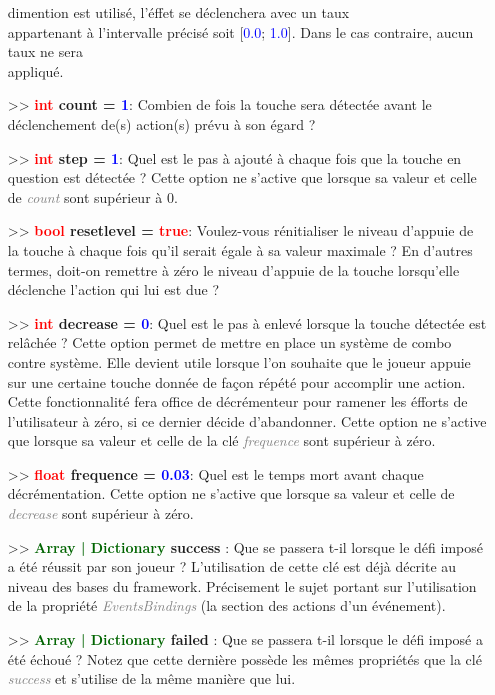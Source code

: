 \documentclass[a4paper, 11pt]{article}
\begin{document}
\begin{itemize}
		dimention est utilisé, l'éffet se déclenchera avec un taux \\appartenant à l'intervalle précisé soit 
		[\textcolor{blue}{0.0}; \textcolor{blue}{1.0}]. Dans le cas contraire, aucun taux ne sera
		\\appliqué.\\
		\item[>> \textbf{\textcolor{red}{int} count = \textcolor{blue}{1}}:] Combien de fois la touche sera 
		détectée avant le déclenchement de(s) action(s) prévu à son égard ?\\
		\item[>> \textbf{\textcolor{red}{int} step = \textcolor{blue}{1}}:] Quel est le pas à ajouté à 
		chaque fois que la touche en question est détectée ? Cette option ne s'active que lorsque sa valeur 
		et celle de \textit{\textcolor{gray}{count}} sont supérieur à 0.\\
		\item[>> \textbf{\textcolor{red}{bool} resetlevel = \textcolor{red}{true}}:] Voulez-vous 
		rénitialiser le niveau d'appuie de la touche à chaque fois qu'il serait égale à sa valeur maximale ?
		En d'autres termes, doit-on remettre à zéro le niveau d'appuie de la touche lorsqu'elle déclenche
		l'action qui lui est due ?\\
		\item[>> \textbf{\textcolor{red}{int} decrease = \textcolor{blue}{0}}:] Quel est le pas à enlevé 
		lorsque la touche détectée est relâchée ? Cette option permet de mettre en place un système de combo 
		contre système. Elle devient utile lorsque l'on souhaite que le joueur appuie sur une certaine 
		touche donnée de façon répété pour accomplir une action. Cette fonctionnalité fera office de 
		décrémenteur pour ramener les éfforts de l'utilisateur à zéro, si ce dernier décide d'abandonner. 
		Cette option ne s'active que lorsque sa valeur et celle de la clé \textcolor{gray}
		{\textit{frequence}} sont supérieur à zéro.\\
		\item[>> \textbf{\textcolor{red}{float} frequence = \textcolor{blue}{0.03}}:] Quel est le temps mort 
		avant chaque décrémentation. Cette option ne s'active que lorsque sa valeur et celle de
		\textcolor{gray}{\textit{decrease}} sont supérieur à zéro.\\
		\item[>> \textbf{\textcolor{darkgreen}{Array | Dictionary} success}]: Que se passera t-il lorsque le 
		défi imposé a été réussit par son joueur ? L'utilisation de cette clé est déjà décrite au niveau des 
		bases du framework. Précisement le sujet portant sur l'utilisation de la propriété
		\textit{\textcolor{gray}{EventsBindings}} (la section des actions d'un événement).\\
		\item[>> \textbf{\textcolor{darkgreen}{Array | Dictionary} failed}]: Que se passera t-il lorsque le 
		défi imposé a été échoué ? Notez que cette dernière possède les mêmes propriétés que la clé  
		\textit{\textcolor{gray}{success}} et s'utilise de la même manière que lui.\\
	\end{itemize}
\end{document}
